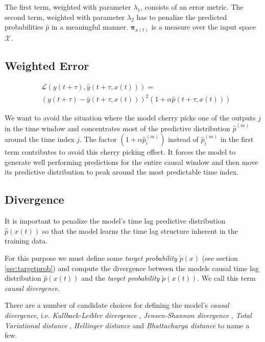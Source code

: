 \documentclass[envcountsect,runningheads]{llncs}
\theoremstyle{etoile}
\begin{document}
The first term, weighted with parameter $\lambda_1$, consists of an 
error metric. The second term, weighted with parameter $\lambda_2$ has to 
penalize the predicted probabilities $\hat{p}$ in a meaningful manner. 
$\mathbf{\pi}_{x(t)}$ is a measure over the input space $\mathcal{X}$.


\subsection{Weighted Error}


\begin{align}\label{eq:errorfunc}
&\mathcal{L}(y(t + \tau), \hat{y}(t + \tau, x(t))) = \\ 
\nonumber &\left (y(t + \tau) - \hat{y}(t + \tau, x(t)) \right)^2 
(1 + \alpha \hat{p}(t + \tau, x(t)))
\end{align}

We want to avoid the situation where the model cherry picks one of the outputs 
$j$ in the time window and concentrates most of the predictive 
distribution $\hat p^{(m)}$ around the time index $j$. The factor 
$(1 + \alpha \hat p_i^{(m)})$ instead of $\hat p_i^{(m)}$ in the first term 
contributes to avoid this cherry picking effect. It forces the model to 
generate well performing predictions for the entire causal window and then 
move its predictive distribution to peak around the most predictable time index.

\subsection{Divergence}

It is important to penalize the model's time lag predictive distribution 
$\hat{p}(x(t))$ so that the model learns the time lag structure inherent in the 
training data.

For this purpose we must define some \emph{target probability} $\tilde{p}(x)$ 
(see section \ref{sec:targetprob}) and compute the divergence between the models causal 
time lag distribution $\hat{p}(x(t))$ and the \emph{target probability} $\tilde{p}(x(t))$. 
We call this term \emph{causal divergence}.

There are a number of candidate choices for defining the model's \emph{causal divergence}, 
i.e.  \emph{Kullback-Leibler divergence} \cite{kullback1951}, 
\emph{Jensen-Shannon divergence} \cite{jensen-shannon}, \emph{Total Variational distance} 
\cite{villani2009three}, \emph{Hellinger distance} \cite{hellinger} and 
\emph{Bhattacharya distance} \cite{bhattacharyya} to name a few. 
\end{document}
